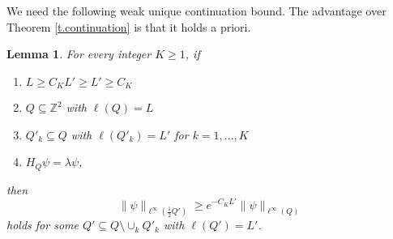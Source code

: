 \documentclass{amsart}
\newtheorem{lemma}[equation]{Lemma}
\newcommand{\tref}[1]{Theorem \ref{t.#1}}
\numberwithin{equation}{section}
\numberwithin{figure}{section}
\newcommand{\Z}{\mathbb{Z}}
\begin{document}
We need the following weak unique continuation bound.  The advantage over \tref{continuation} is that it holds a priori.

\begin{lemma}
\label{l.crudecontinuation}
For every integer $K \geq 1$, if
\begin{enumerate}
\item $L \geq C_K L' \geq L' \geq C_K$
\item $Q \subseteq \Z^2$ with $\ell(Q) = L$
\item $Q'_k \subseteq Q$ with $\ell(Q'_k) = L'$ for $k = 1, ..., K$
\item $H_Q \psi = \lambda \psi$,
\end{enumerate}
then
\begin{equation*}
\| \psi \|_{\ell^\infty(\frac12 Q')} \geq e^{-C_K L'} \| \psi \|_{\ell^\infty(Q)}
\end{equation*}
holds for some $Q' \subseteq Q \setminus \cup_k Q'_k$ with $\ell(Q') = L'$.
\end{lemma}
\end{document}

